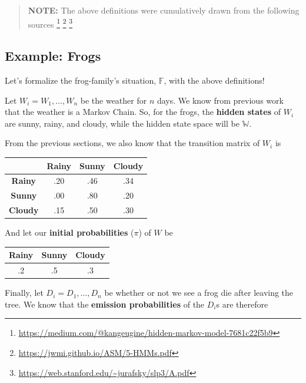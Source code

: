 \documentclass[
]{book}
\begin{document}
\begin{quote}
\textbf{NOTE:} The above definitions were cumulatively drawn from the following sources \footnote{\url{https://medium.com/@kangeugine/hidden-markov-model-7681c22f5b9}} \footnote{\url{https://jwmi.github.io/ASM/5-HMMs.pdf}} \footnote{\url{https://web.stanford.edu/~jurafsky/slp3/A.pdf}}
\end{quote}

\hypertarget{example-frogs}{%
\subsection*{Example: Frogs}\label{example-frogs}}

Let's formalize the frog-family's situation, \(\mathbb{F}\), with the above definitions!

Let \(W_i = W_1, \dots , W_n\) be the weather for \(n\) days. We know from previous work that the weather is a Markov Chain. So, for the frogs, the \textbf{hidden states} of \(W_i\) are sunny, rainy, and cloudy, while the hidden state space will be \(\mathbb{W}\).

From the previous sections, we also know that the transition matrix of \(W_i\) is

\begin{longtable}[]{@{}cccc@{}}
\toprule\noalign{}
& Rainy & Sunny & Cloudy \\
\midrule\noalign{}
\endhead
\bottomrule\noalign{}
\endlastfoot
\textbf{Rainy} & .20 & .46 & .34 \\
\textbf{Sunny} & .00 & .80 & .20 \\
\textbf{Cloudy} & .15 & .50 & .30 \\
\end{longtable}

And let our \textbf{initial probabilities} (\(\pi\)) of \(W\) be

\begin{longtable}[]{@{}ccc@{}}
\toprule\noalign{}
Rainy & Sunny & Cloudy \\
\midrule\noalign{}
\endhead
\bottomrule\noalign{}
\endlastfoot
.2 & .5 & .3 \\
\end{longtable}

\hfill\break

Finally, let \(D_i = D_1, \dots, D_n\) be whether or not we see a frog die after leaving the tree. We know that the \textbf{emission probabilities} of the \(D_i\)s are therefore
\end{document}
